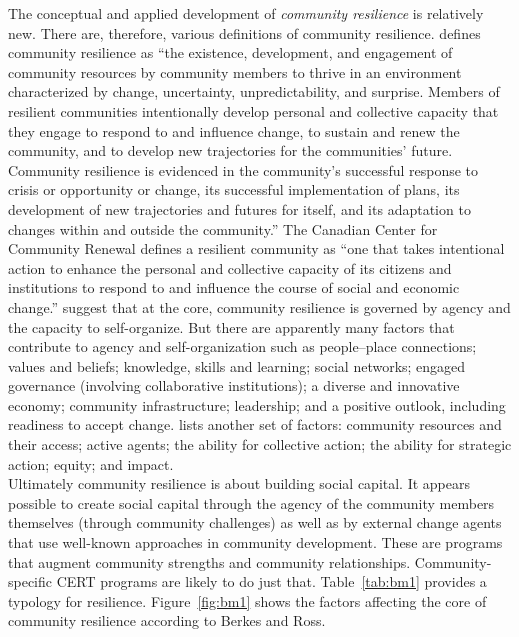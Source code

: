 \documentclass[11pt,fleqn]{book} %
\begin{document}
\noindent The conceptual and applied development of \textit{community resilience} is relatively new. There are, therefore, various definitions of community resilience. \textcite{magis_community_2010} defines community resilience as \enquote{the existence, development, and engagement of community resources by community members to thrive in an environment characterized by change, uncertainty, unpredictability, and surprise. Members of resilient communities intentionally develop personal and collective capacity that they engage to respond to and influence change, to sustain and renew the community, and to develop new trajectories for the communities’ future. Community resilience is evidenced in the community’s successful response to crisis or opportunity or change, its successful implementation of plans, its development of new trajectories and futures for itself, and its adaptation to changes within and outside the community.} The Canadian Center for Community Renewal
defines a resilient community as \enquote{one that takes intentional action to enhance the personal and collective capacity of its citizens and institutions to respond to and influence the course of social and economic change.} \textcite{berkes_community_2013} suggest that at the core, community resilience is governed by agency and the capacity to self-organize. But there are apparently many factors that contribute to agency and self-organization such as people–place connections; values and beliefs; knowledge, skills and learning; social networks; engaged governance (involving collaborative institutions); a diverse and innovative economy; community infrastructure; leadership; and a positive outlook, including readiness to accept change. \textcite{magis_community_2010} lists another set of factors: community resources and their access; active agents; the ability for collective action; the ability for strategic action; equity; and impact.\\

\noindent Ultimately community resilience is about building social capital. It appears possible to create social capital through the agency of the community members themselves (through community challenges) as well as by external change agents that use well-known approaches in community development. These are programs that augment community strengths and community relationships. Community-specific CERT programs are likely to do just that. Table~\ref{tab:bm1} provides a typology for resilience. Figure~\ref{fig:bm1} shows the factors affecting the core of community resilience according to Berkes and Ross.\\
\end{document}
